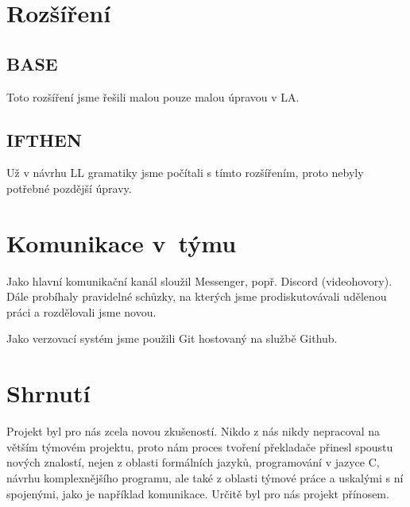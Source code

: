 \documentclass[11pt, a4paper]{article}
\begin{document}
\section{Rozšíření}
\subsection{BASE}
Toto rozšíření jsme řešili malou pouze malou úpravou v LA.  
\subsection{IFTHEN}
Už v návrhu LL gramatiky jsme počítali s tímto rozšířením, proto nebyly potřebné pozdější úpravy.  

\section{Komunikace v~týmu}
Jako hlavní komunikační kanál sloužil Messenger, popř. Discord (videohovory). Dále probíhaly pravidelné schůzky, na kterých jsme prodiskutovávali udělenou práci a rozdělovali jsme novou.  

Jako verzovací systém jsme použili Git hostovaný na službě Github. 

\section{Shrnutí}
Projekt byl pro nás zcela novou zkušeností. Nikdo z nás nikdy nepracoval na větším týmovém projektu, proto nám proces tvoření překladače přinesl spoustu nových znalostí, nejen z oblasti formálních jazyků, programování v jazyce C, návrhu komplexnějšího programu, ale také z oblasti týmové práce a uskalými s ní spojenými, jako je například komunikace. Určitě byl pro nás projekt přínosem. 
\end{document}
